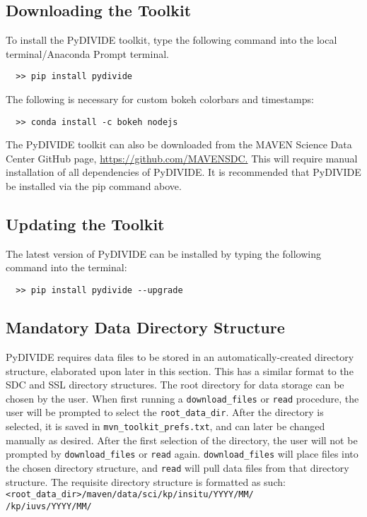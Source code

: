 \documentclass{article}
\begin{document}
\subsection{Downloading the Toolkit}
To install the PyDIVIDE toolkit, type the following command into the local terminal/Anaconda Prompt terminal.
\vspace{-5mm}
\begin{verbatim}
  >> pip install pydivide
\end{verbatim}
The following is necessary for custom bokeh colorbars and timestamps:
\vspace{-5mm}
\begin{verbatim}
  >> conda install -c bokeh nodejs
\end{verbatim}
The PyDIVIDE toolkit can also be downloaded from the MAVEN Science Data Center GitHub page, \href{https://github.com/MAVENSDC}{https://github.com/MAVENSDC.}
This will require manual installation of all dependencies of PyDIVIDE. It is recommended that PyDIVIDE be installed via the pip command above.

\subsection{Updating the Toolkit}
The latest version of PyDIVIDE can be installed by typing the following command into the terminal:
\vspace{-5mm}
\begin{verbatim}
  >> pip install pydivide --upgrade
\end{verbatim}

\subsection{Mandatory Data Directory Structure}
\label{subsec:Mandatory Data Directory Structure}
PyDIVIDE requires data files to be stored in an automatically-created directory structure, elaborated upon later in this section. This has a similar format to the SDC and SSL directory structures. The root directory for data storage can be chosen by the user. When first running a \texttt{download\_files} or \texttt{read} procedure, the user will be prompted to select the \texttt{root\_data\_dir}. After the directory is selected, it is saved in \texttt{mvn\_toolkit\_prefs.txt}, and can later be changed manually as desired. After the first selection of the directory, the user will not be prompted by \texttt{download\_files} or \texttt{read} again. \texttt{download\_files} will place files into the chosen directory structure, and \texttt{read} will pull data files from that directory structure. The requisite directory structure is formatted as such:\\
\texttt{<root\_data\_dir>/maven/data/sci/kp/insitu/YYYY/MM/}\\
\texttt{\indent \indent \indent \indent \indent \indent \indent \indent \indent \indent \enskip /kp/iuvs/YYYY/MM/}\\
\end{document}
